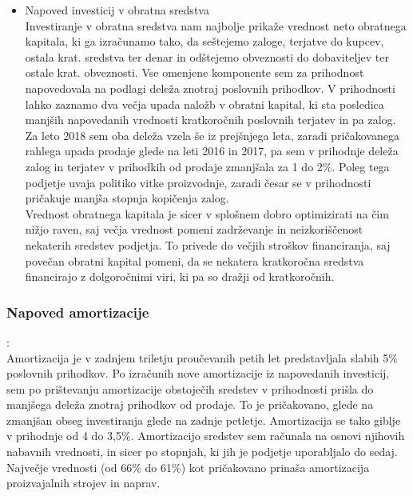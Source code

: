 \documentclass[12pt,a4paper]{amsart}
\theoremstyle{definition} %
\theoremstyle{plain} %
\begin{document}
\begin{itemize}
\item{Napoved investicij v obratna sredstva}\\
Investiranje v obratna sredstva nam najbolje prikaže vrednost neto obratnega kapitala, ki ga izračunamo tako, da seštejemo zaloge, terjatve do kupcev, ostala krat. sredstva ter denar in odštejemo obveznosti do dobaviteljev ter ostale krat. obveznosti. Vse omenjene komponente sem za prihodnost napovedovala na podlagi deleža znotraj poslovnih prihodkov. V prihodnosti lahko zaznamo dva večja upada naložb v obratni kapital, ki sta posledica manjših napovedanih vrednosti kratkoročnih poslovnih terjatev in pa zalog. Za leto 2018 sem oba deleža vzela še iz prejšnjega leta, zaradi pričakovanega rahlega upada prodaje glede na leti 2016 in 2017, pa sem v prihodnje deleža zalog in terjatev v prihodkih od prodaje zmanjšala za 1 do 2\%. Poleg tega podjetje uvaja politiko vitke proizvodnje, zaradi česar se v prihodnosti pričakuje manjša stopnja kopičenja zalog.\\
Vrednost obratnega kapitala je sicer v splošnem dobro optimizirati na čim nižjo raven, saj večja vrednost pomeni zadrževanje in neizkoriščenost nekaterih sredstev podjetja. To privede do večjih stroškov financiranja, saj povečan obratni kapital pomeni, da se nekatera kratkoročna sredstva financirajo z dolgoročnimi viri, ki pa so dražji od kratkoročnih.
\end{itemize}


\subsubsection{Napoved amortizacije}:\\

Amortizacija je v zadnjem triletju proučevanih petih let predstavljala slabih 5\% poslovnih prihodkov. Po izračunih nove amortizacije iz napovedanih investicij, sem po prištevanju amortizacije obstoječih sredstev v prihodnosti prišla do manjšega deleža znotraj prihodkov od prodaje. To je pričakovano, glede na zmanjšan obseg investiranja glede na zadnje petletje. Amortizacija se tako giblje v prihodnje od 4 do 3,5\%. Amortizacijo sredstev sem računala na osnovi njihovih nabavnih vrednosti, in sicer po stopnjah, ki jih je podjetje uporabljalo do sedaj. Največje vrednosti (od 66\% do 61\%) kot pričakovano prinaša amortizacija proizvajalnih strojev in naprav. \\
\end{document}
